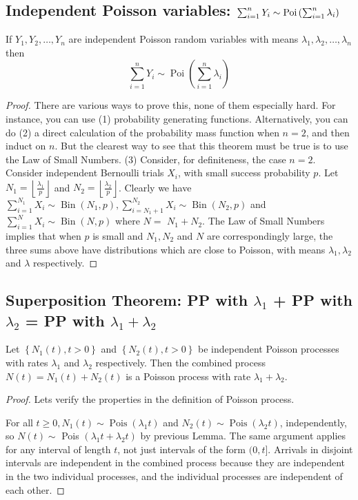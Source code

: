 \documentclass[11pt]{elegantbook}
\begin{document}
\subsection{Independent Poisson variables: $\sum_{i=1}^n Y_i\sim \textnormal{Poi}\left(\sum_{i=1}^n\lambda_i\right)$}
\begin{lemma}
    If $Y_1, Y_2, \ldots, Y_n$ are independent Poisson random variables with means $\lambda_1, \lambda_2, \ldots, \lambda_n$ then
    $$
    \sum_{i=1}^n Y_i \sim \operatorname{Poi}\left(\sum_{i=1}^n \lambda_i\right)
    $$
\end{lemma}
\begin{proof}
    There are various ways to prove this, none of them especially hard. For instance, you can use (1) probability generating functions. Alternatively, you can do (2) a direct calculation of the probability mass function when $n=2$, and then induct on $n$. But the clearest way to see that this theorem must be true is to use the Law of Small Numbers. (3) Consider, for definiteness, the case $n=2$. Consider independent Bernoulli trials $X_i$, with small success probability $p$. Let $N_1=\left\lfloor\frac{\lambda_1}{p}\right\rfloor$ and $N_2=\left\lfloor\frac{\lambda_2}{p}\right\rfloor$. Clearly we have $\sum_{i=1}^{N_1} X_i \sim \operatorname{Bin}\left(N_1, p\right), \sum_{i=N_1+1}^{N_2} X_i \sim \operatorname{Bin}\left(N_2, p\right)$ and $\sum_{i=1}^N X_i \sim \operatorname{Bin}(N, p)$ where $N=$ $N_1+N_2$. The Law of Small Numbers implies that when $p$ is small and $N_1, N_2$ and $N$ are correspondingly large, the three sums above have distributions which are close to Poisson, with means $\lambda_1, \lambda_2$ and $\lambda$ respectively.
\end{proof}

\subsection{Superposition Theorem: PP with $\lambda_1$ + PP with $\lambda_2$ = PP with $\lambda_1+\lambda_2$}
\begin{theorem}
    Let $\left\{N_1(t), t>0\right\}$ and $\left\{N_2(t), t>0\right\}$ be independent Poisson processes with rates $\lambda_1$ and $\lambda_2$ respectively. Then the combined process $N(t)=N_1(t)+N_2(t)$ is a Poisson process with rate $\lambda_1+\lambda_2$.
\end{theorem}
\begin{proof}
    Lets verify the properties in the definition of Poisson process.
    
    For all $t \geq 0, N_1(t) \sim \operatorname{Pois}\left(\lambda_1 t\right)$ and $N_2(t) \sim \operatorname{Pois}\left(\lambda_2 t\right)$, independently, so $N(t) \sim$ Pois $\left(\lambda_1 t+\lambda_2 t\right)$ by previous Lemma. The same argument applies for any interval of length $t$, not just intervals of the form $(0, t]$. Arrivals in disjoint intervals are independent in the combined process because they are independent in the two individual processes, and the individual processes are independent of each other.
\end{proof}
\end{document}
